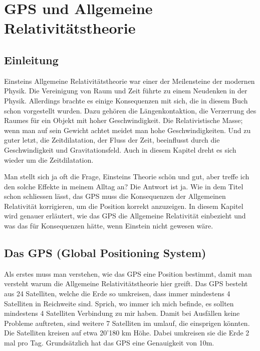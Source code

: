 
\chapter{GPS und Allgemeine Relativitätstheorie\label{chapter:thema}}
\begin{refsection}

\section{Einleitung}
Einsteins Allgemeine Relativitätstheorie war einer der Meilensteine der modernen Physik. Die Vereinigung von Raum und Zeit führte zu einem Neudenken in der Physik. Allerdings brachte es einige Konsequenzen mit sich, die in diesem Buch schon vorgestellt wurden. Dazu gehören die Längenkontaktion, die Verzerrung des Raumes für ein Objekt mit hoher Geschwindigkeit. Die Relativistische Masse; wenn man auf sein Gewicht achtet meidet man hohe Geschwindigkeiten. Und zu guter letzt, die Zeitdilatation, der Fluss der Zeit, beeinflusst durch die Geschwindigkeit und Gravitationsfeld. Auch in diesem Kapitel dreht es sich wieder um die Zeitdilatation.

Man stellt sich ja oft die Frage, Einsteins Theorie schön und gut, aber treffe ich den solche Effekte in meinem Alltag an? Die Antwort ist ja. Wie in dem Titel schon schliessen lässt, das GPS muss die Konsequenzen der Allgemeinen Relativität korrigieren, um die Position korrekt anzuzeigen. In diesem Kapitel wird genauer erläutert, wie das GPS die Allgemeine Relativität einbezieht und was das für Konsequenzen hätte, wenn Einstein nicht gewesen wäre.

\section{Das GPS (Global Positioning System)}
Als erstes muss man verstehen, wie das GPS eine Position bestimmt, damit man versteht warum die Allgemeine Relativitätstheorie hier greift. Das GPS besteht aus 24 Satelliten, welche die Erde so umkreisen, dass immer mindestens 4 Satelliten in Reichweite sind. Sprich, wo immer ich mich befinde, es sollten mindestens 4 Satelliten Verbindung zu mir haben. Damit bei Ausfällen keine Probleme auftreten, sind weitere 7 Satelliten im umlauf, die einsprigen könnten. Die Satelliten kreisen auf etwa 20'180 km Höhe. Dabei umkreisen sie die Erde 2 mal pro Tag. Grundsätzlich hat das GPS eine Genauigkeit von 10m. 


\end{refsection}
